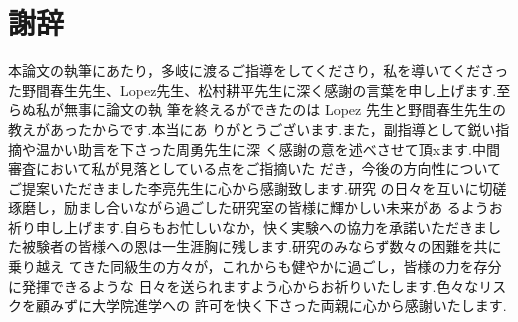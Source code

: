 \chapter*{謝辞}
本論文の執筆にあたり，多岐に渡るご指導をしてくださり，私を導いてくださった野間春生先生、Lopez先生、松村耕平先生に深く感謝の言葉を申し上げます.至らぬ私が無事に論文の執 筆を終えるができたのは Lopez 先生と野間春生先生の教えがあったからです.本当にあ りがとうございます.また，副指導として鋭い指摘や温かい助言を下さった周勇先生に深 く感謝の意を述べさせて頂xます.中間審査において私が見落としている点をご指摘いた だき，今後の方向性についてご提案いただきました李亮先生に心から感謝致します.研究 の日々を互いに切磋琢磨し，励まし合いながら過ごした研究室の皆様に輝かしい未来があ るようお祈り申し上げます.自らもお忙しいなか，快く実験への協力を承諾いただきまし た被験者の皆様への恩は一生涯胸に残します.研究のみならず数々の困難を共に乗り越え てきた同級生の方々が，これからも健やかに過ごし，皆様の力を存分に発揮できるような 日々を送られますよう心からお祈りいたします.色々なリスクを顧みずに大学院進学への 許可を快く下さった両親に心から感謝いたします.
